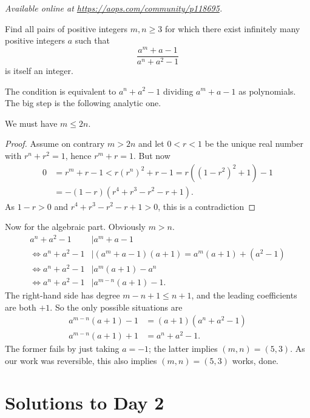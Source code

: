 \textsl{Available online at \url{https://aops.com/community/p118695}.}
\begin{mdframed}[style=mdpurplebox,frametitle={Problem statement}]
Find all pairs of positive integers
$m, n \ge 3$ for which there exist infinitely many
positive integers $a$ such that
\[ \frac{a^m+a-1}{a^n+a^2-1} \]
is itself an integer.
\end{mdframed}
The condition is equivalent to $a^n+a^2-1$
dividing $a^m+a-1$ as polynomials.
The big step is the following analytic one.

\begin{claim*}
  We must have $m \le 2n$.
\end{claim*}
\begin{proof}
  Assume on contrary $m > 2n$
  and let $0 < r < 1$ be the unique real number
  with $r^n+r^2 = 1$, hence $r^m+r = 1$.
  But now
  \begin{align*}
    0 &= r^m + r - 1 < r(r^n)^2 + r - 1 = r\left( (1-r^2)^2+1 \right) - 1 \\
    &= -(1-r)\left( r^4+r^3-r^2-r+1 \right).
  \end{align*}
  As $1-r > 0$ and $r^4+r^3-r^2-r+1 > 0$, this is a contradiction
\end{proof}

Now for the algebraic part.
Obviously $m > n$.
\begin{align*}
  a^n+a^2-1 &\mid a^m+a-1 \\
  \iff a^n+a^2-1 &\mid (a^m+a-1)(a+1) = a^m(a+1) + (a^2-1)  \\
  \iff a^n+a^2-1 &\mid a^m(a+1) - a^n \\
  \iff a^n+a^2-1 &\mid a^{m-n}(a+1) - 1.
\end{align*}
The right-hand side has degree $m-n+1 \le n+1$,
and the leading coefficients are both $+1$.
So the only possible situations are
\begin{align*}
  a^{m-n}(a+1) - 1 &= (a+1)\left( a^n+a^2-1 \right) \\
  a^{m-n}(a+1) + 1 &=  a^n+a^2-1.
\end{align*}
The former fails by just taking $a=-1$;
the latter implies $(m,n) = (5,3)$.
As our work was reversible, this also implies $(m,n) = (5,3)$ works, done.
\pagebreak

\section{Solutions to Day 2}